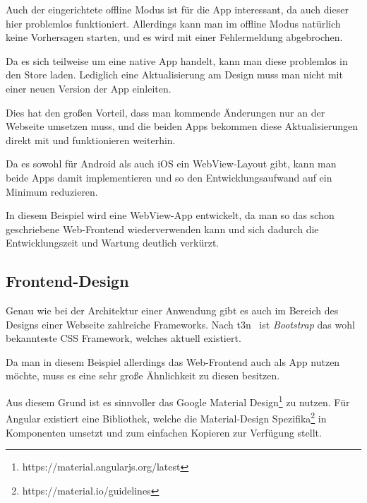 Auch der eingerichtete offline Modus ist für die App interessant, da auch dieser hier problemlos funktioniert.
Allerdings kann man im offline Modus natürlich keine Vorhersagen starten, und es wird mit einer Fehlermeldung
abgebrochen.

Da es sich teilweise um eine native App handelt, kann man diese problemlos in den Store laden. Lediglich eine
Aktualisierung am Design muss man nicht mit einer neuen Version der App einleiten.

Dies hat den großen Vorteil, dass man kommende Änderungen nur an der Webseite umsetzen muss, und die beiden Apps
bekommen diese Aktualisierungen direkt mit und funktionieren weiterhin.

Da es sowohl für Android als auch iOS ein WebView-Layout gibt, kann man beide Apps damit implementieren und so den
Entwicklungsaufwand auf ein Minimum reduzieren.

In diesem Beispiel wird eine WebView-App entwickelt, da man so das schon geschriebene Web-Frontend wiederverwenden
kann und sich dadurch die Entwicklungszeit und Wartung deutlich verkürzt.

\subsection{Frontend-Design}
Genau wie bei der Architektur einer Anwendung gibt es auch im Bereich des Designs einer Webseite zahlreiche Frameworks.
Nach t3n~\cite{online_analyse_css} ist \textit{Bootstrap} das wohl bekannteste CSS Framework, welches aktuell existiert.

Da man in diesem Beispiel allerdings das Web-Frontend auch als App nutzen möchte, muss es eine sehr große Ähnlichkeit zu
diesen besitzen.

Aus diesem Grund ist es sinnvoller das Google Material Design\footnote{https://material.angularjs.org/latest} zu nutzen.
Für Angular existiert eine Bibliothek, welche die Material-Design Spezifika\footnote{https://material.io/guidelines} in
Komponenten umsetzt und zum einfachen Kopieren zur Verfügung stellt.
